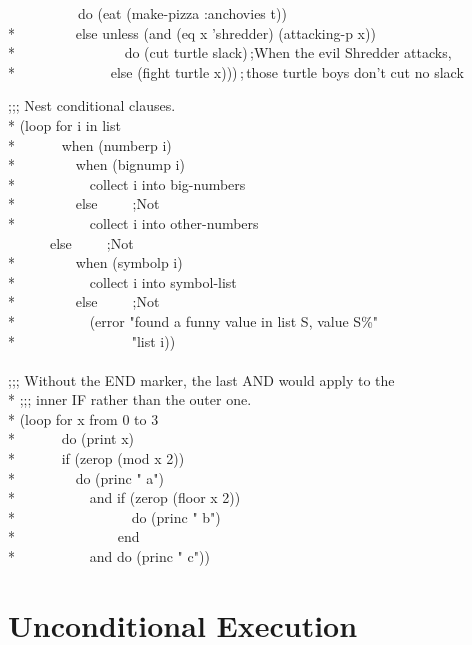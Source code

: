 \begin{defloop}
\begin{lisp}
~~~~~~~~~~do (eat (make-pizza :anchovies t)) \\*
~~~~~~~~else unless (and (eq x 'shredder) (attacking-p x))\\*
~~~~~~~~~~~~~~~do (cut turtle slack)\,;{\rm When the evil Shredder attacks,} \\*
~~~~~~~~~~~~~else (fight turtle x)))\,;\,{\rm those turtle boys don't cut no slack}
\end{lisp}
\goodbreak
\begin{lisp}
;;; Nest conditional clauses. \\*
(loop for i in list \\*
~~~~~~when (numberp i) \\*
~~~~~~~~when (bignump i) \\*
~~~~~~~~~~collect i into big-numbers \\*
~~~~~~~~else~~~~~;{\rm Not } \\*
~~~~~~~~~~collect i into other-numbers \\
~~~~~~else~~~~~;{\rm Not } \\*
~~~~~~~~when (symbolp i)  \\*
~~~~~~~~~~collect i into symbol-list \\*
~~~~~~~~else~~~~~;{\rm Not } \\*
~~~~~~~~~~(error "found a funny value in list {\Xtilde}S, value {\Xtilde}S{\Xtilde}\%" \\*
~~~~~~~~~~~~~~~~"list i)) \\
 \\
;;; Without the END marker, the last AND would apply to the \\*
;;; inner IF rather than the outer one. \\*
(loop for x from 0 to 3  \\*
~~~~~~do (print x) \\*
~~~~~~if (zerop (mod x 2)) \\*
~~~~~~~~do (princ " a") \\*
~~~~~~~~~~and if (zerop (floor x 2)) \\*
~~~~~~~~~~~~~~~~do (princ " b") \\*
~~~~~~~~~~~~~~end \\*
~~~~~~~~~~and do (princ " c"))
\end{lisp}
\end{defloop}


\section{Unconditional Execution}
\label{LOOP-UNCOND-SECTION}



